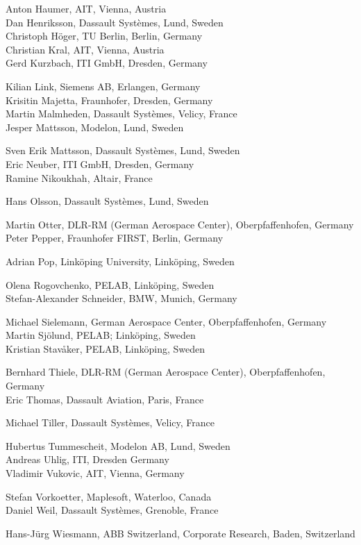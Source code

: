 \documentclass[10pt,a4paper]{report}
\begin{document}
Anton Haumer, AIT, Vienna, Austria\\
Dan Henriksson, Dassault Systèmes, Lund, Sweden\\
Christoph Höger, TU Berlin, Berlin, Germany\\
Christian Kral, AIT, Vienna, Austria\\
Gerd Kurzbach, ITI GmbH, Dresden, Germany

Kilian Link, Siemens AB, Erlangen, Germany\\
Krisitin Majetta, Fraunhofer, Dresden, Germany\\
Martin Malmheden, Dassault Systèmes, Velicy, France\\
Jesper Mattsson, Modelon, Lund, Sweden

Sven Erik Mattsson, Dassault Systèmes, Lund, Sweden\\
Eric Neuber, ITI GmbH, Dresden, Germany\\
Ramine Nikoukhah, Altair, France

Hans Olsson, Dassault Systèmes, Lund, Sweden

Martin Otter, DLR-RM (German Aerospace Center), Oberpfaffenhofen,
Germany\\
Peter Pepper, Fraunhofer FIRST, Berlin, Germany

Adrian Pop, Linköping University, Linköping, Sweden

Olena Rogovchenko, PELAB, Linköping, Sweden\\
Stefan-Alexander Schneider, BMW, Munich, Germany

Michael Sielemann, German Aerospace Center, Oberpfaffenhofen, Germany\\
Martin Sjölund, PELAB; Linköping, Sweden\\
Kristian Stavåker, PELAB, Linköping, Sweden

Bernhard Thiele, DLR-RM (German Aerospace Center), Oberpfaffenhofen,
Germany\\
Eric Thomas, Dassault Aviation, Paris, France

Michael Tiller, Dassault Systèmes, Velicy, France

Hubertus Tummescheit, Modelon AB, Lund, Sweden\\
Andreas Uhlig, ITI, Dresden Germany\\
Vladimir Vukovic, AIT, Vienna, Germany

Stefan Vorkoetter, Maplesoft, Waterloo, Canada\\
Daniel Weil, Dassault Systèmes, Grenoble, France

Hans-Jürg Wiesmann, ABB Switzerland, Corporate Research, Baden,
Switzerland
\end{document}
